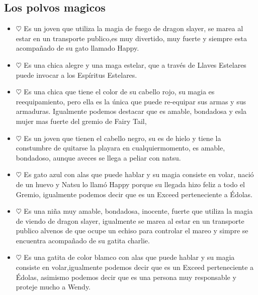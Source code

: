 \documentclass[a5paper,11pt]{article}
\begin{document}
\subsection{Los polvos magicos}
\begin {itemize}
    \item[$\heartsuit$] Es un joven que utiliza la magia de fuego de dragon slayer, se marea al estar en un transporte publico,es muy divertido, muy fuerte y siempre esta acompañado de su gato llamado Happy.
    \item[$\heartsuit$]Es una chica alegre y una maga estelar, que a través de Llaves Estelares  puede invocar a los Espíritus Estelares.
    \item[$\heartsuit$]Es una chica que tiene el color de su cabello rojo, su magia es reequipamiento, pero ella es la única que puede re-equipar sus armas y sus armaduras. Igualmente podemos destacar que es amable, bondadosa y esla mujer mas fuerte del gremio de Fairy Tail, 
    \item[$\heartsuit$]Es un joven que tienen el cabello negro, su es de hielo y tiene la constumbre de quitarse la playara en cualquiermomento, es amable, bondadoso, aunque aveces se llega a peliar con natsu.
    \item[$\heartsuit$]Es gato azul con alas que puede hablar y su magia consiste en volar, nació de un huevo y Natsu lo llamó Happy porque su llegada hizo feliz a todo el Gremio, igualmente podemos decir que es un Exceed perteneciente a Édolas.
    \item[$\heartsuit$]Es una niña muy amable, bondadosa, inocente, fuerte que utiliza la magia de viendo de dragon slayer, igualmente se marea al estar en un transporte publico alvenos de que ocupe un echiso para controlar el mareo y simpre se encuentra acompañado de su gatita charlie.
    \item[$\heartsuit$]Es una gatita de color blamco con alas que puede hablar y su magia consiste en volar,igualmente podemos decir que es un Exceed perteneciente a Édolas, asimismo podemos decir que es una persona muy responsable y proteje mucho a Wendy.
  \end{itemize}
\end{document}
